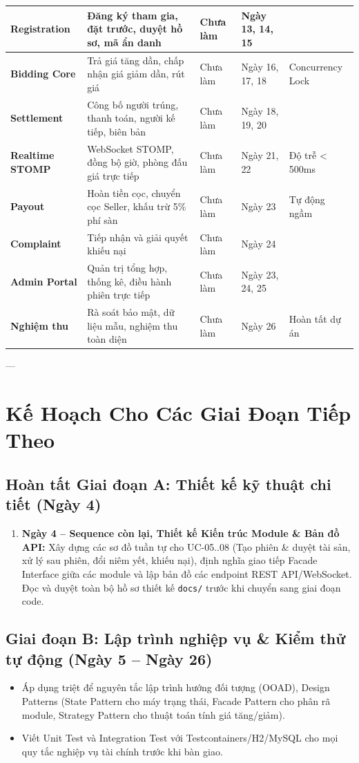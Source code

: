 \documentclass[a4paper]{article}
\begin{document}
\begin{longtable}{|p{2.6cm}|p{5.5cm}|p{2.3cm}|p{1.6cm}|p{3.2cm}|}
\hline
\textbf{Registration} & Đăng ký tham gia, đặt trước, duyệt hồ sơ, mã ẩn danh & Chưa làm & Ngày 13, 14, 15 & \\
\hline
\textbf{Bidding Core} & Trả giá tăng dần, chấp nhận giá giảm dần, rút giá & Chưa làm & Ngày 16, 17, 18 & Concurrency Lock \\
\hline
\textbf{Settlement} & Công bố người trúng, thanh toán, người kế tiếp, biên bản & Chưa làm & Ngày 18, 19, 20 & \\
\hline
\textbf{Realtime STOMP} & WebSocket STOMP, đồng bộ giờ, phòng đấu giá trực tiếp & Chưa làm & Ngày 21, 22 & Độ trễ < 500ms \\
\hline
\textbf{Payout} & Hoàn tiền cọc, chuyển cọc Seller, khấu trừ 5\% phí sàn & Chưa làm & Ngày 23 & Tự động ngầm \\
\hline
\textbf{Complaint} & Tiếp nhận và giải quyết khiếu nại & Chưa làm & Ngày 24 & \\
\hline
\textbf{Admin Portal} & Quản trị tổng hợp, thống kê, điều hành phiên trực tiếp & Chưa làm & Ngày 23, 24, 25 & \\
\hline
\textbf{Nghiệm thu} & Rà soát bảo mật, dữ liệu mẫu, nghiệm thu toàn diện & Chưa làm & Ngày 26 & Hoàn tất dự án \\
\hline
\end{longtable}

---

\section{Kế Hoạch Cho Các Giai Đoạn Tiếp Theo}

\subsection{Hoàn tất Giai đoạn A: Thiết kế kỹ thuật chi tiết (Ngày 4)}
\begin{enumerate}
    \item \textbf{Ngày 4 -- Sequence còn lại, Thiết kế Kiến trúc Module \& Bản đồ API:}
    Xây dựng các sơ đồ tuần tự cho UC-05..08 (Tạo phiên \& duyệt tài sản, xử lý sau phiên, đổi niêm yết, khiếu nại), định nghĩa giao tiếp Facade Interface giữa các module và lập bản đồ các endpoint REST API/WebSocket. Đọc và duyệt toàn bộ hồ sơ thiết kế \texttt{docs/} trước khi chuyển sang giai đoạn code.
\end{enumerate}

\subsection{Giai đoạn B: Lập trình nghiệp vụ \& Kiểm thử tự động (Ngày 5 -- Ngày 26)}
\begin{itemize}
    \item Áp dụng triệt để nguyên tắc lập trình hướng đối tượng (OOAD), Design Patterns (State Pattern cho máy trạng thái, Facade Pattern cho phân rã module, Strategy Pattern cho thuật toán tính giá tăng/giảm).
    \item Viết Unit Test và Integration Test với Testcontainers/H2/MySQL cho mọi quy tắc nghiệp vụ tài chính trước khi bàn giao.
\end{itemize}
\end{document}

